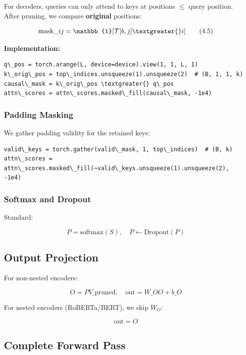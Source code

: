 For decoders, queries can only attend to keys at positions $\leq$ query 
position. After pruning, we compare \textbf{original} positions:

\[
\text{mask}\_{ij} = \mathbb{1}[\mathcal{T}[b, j] \textgreater{} i]
\tag{4.5}
\]

\textbf{Implementation:}

\begin{lstlisting}
q\_pos = torch.arange(L, device=device).view(1, 1, L, 1)
k\_orig\_pos = top\_indices.unsqueeze(1).unsqueeze(2)  # (B, 1, 1, k)
causal\_mask = k\_orig\_pos \textgreater{} q\_pos
attn\_scores = attn\_scores.masked\_fill(causal\_mask, -1e4)
\end{lstlisting}

\subsubsection{Padding Masking}

We gather padding validity for the retained keys:

\begin{lstlisting}
valid\_keys = torch.gather(valid\_mask, 1, top\_indices)  # (B, k)
attn\_scores = attn\_scores.masked\_fill(~valid\_keys.unsqueeze(1).unsqueeze(2), -1e4)
\end{lstlisting}

\subsubsection{Softmax and Dropout}

Standard:

\[
P = \text{softmax}(S), \quad P \leftarrow \text{Dropout}(P)
\tag{4.6}
\]

\subsection{Output Projection}

For non-nested encoders:

\[
O = P V\_\text{pruned}, \quad \text{out} = W\_O O + b\_O
\tag{4.7}
\]

For nested encoders (RoBERTa/BERT), we skip $W_O$:

\[
\text{out} = O
\tag{4.8}
\]

\subsection{Complete Forward Pass}

